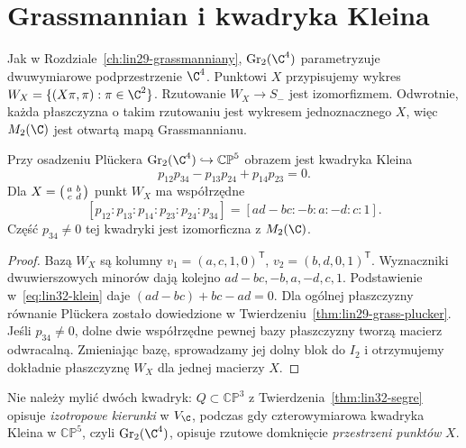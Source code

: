 \section{Grassmannian i kwadryka Kleina}
\label{sec:lin32-klein}
Jak w Rozdziale~\ref{ch:lin29-grassmanniany},
$\operatorname{Gr}_2(\C^4)$ parametryzuje
dwuwymiarowe podprzestrzenie $\C^4$.
Punktowi $X$ przypisujemy wykres
$W_X=\{(X\pi,\pi):\pi\in\C^2\}$.
Rzutowanie $W_X\to S_-$ jest izomorfizmem.
Odwrotnie, każda płaszczyzna o takim rzutowaniu
jest wykresem jednoznacznego $X$,
więc $M_2(\C)$ jest otwartą mapą Grassmannianu.

\begin{twierdzenie}
\label{thm:lin32-plucker}
Przy osadzeniu Plückera
$\operatorname{Gr}_2(\C^4)\hookrightarrow\mathbb{CP}^5$
obrazem jest kwadryka Kleina
\begin{equation}\label{eq:lin32-klein}
 p_{12}p_{34}-p_{13}p_{24}+p_{14}p_{23}=0.
\end{equation}
Dla $X=\begin{psmallmatrix}a&b\\c&d\end{psmallmatrix}$
punkt $W_X$ ma współrzędne
\[
 [p_{12}:p_{13}:p_{14}:p_{23}:p_{24}:p_{34}]
       =[ad-bc:-b:a:-d:c:1].
\]
Część $p_{34}\ne0$ tej kwadryki jest
izomorficzna z $M_2(\C)$.
\end{twierdzenie}
\begin{proof}
Bazą $W_X$ są kolumny
$v_1=(a,c,1,0)^{\mathsf T}$,
$v_2=(b,d,0,1)^{\mathsf T}$.
Wyznaczniki dwuwierszowych minorów
dają kolejno $ad-bc,-b,a,-d,c,1$.
Podstawienie w~\eqref{eq:lin32-klein}
daje $(ad-bc)+bc-ad=0$.
Dla ogólnej płaszczyzny równanie
Plückera zostało dowiedzione w
Twierdzeniu~\ref{thm:lin29-grass-plucker}.
Jeśli $p_{34}\ne0$, dolne dwie
współrzędne pewnej bazy płaszczyzny
tworzą macierz odwracalną.
Zmieniając bazę, sprowadzamy jej dolny
blok do $I_2$ i otrzymujemy dokładnie
płaszczyznę $W_X$ dla jednej macierzy $X$.
\end{proof}

Nie należy mylić dwóch kwadryk:
$Q\subset\mathbb{CP}^3$ z
Twierdzenia~\ref{thm:lin32-segre}
opisuje \emph{izotropowe kierunki}
w $V_{\C}$, podczas gdy czterowymiarowa
kwadryka Kleina w $\mathbb{CP}^5$,
czyli $\operatorname{Gr}_2(\C^4)$,
opisuje rzutowe domknięcie
\emph{przestrzeni punktów} $X$.

